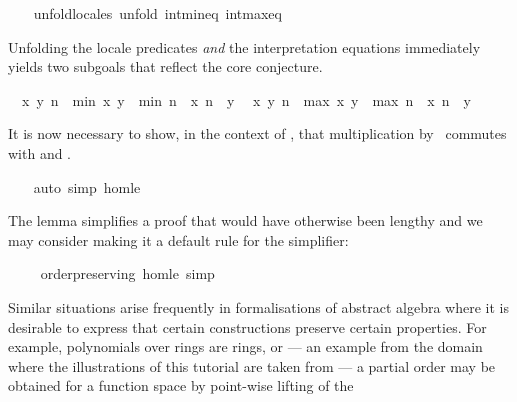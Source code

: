 \begin{isabellebody}
\ \ \isamarkupfalse%
\ {\isacharparenleft}unfold{\isacharunderscore}locales{\isacharcomma}\ unfold\ int{\isacharunderscore}min{\isacharunderscore}eq\ int{\isacharunderscore}max{\isacharunderscore}eq{\isacharparenright}%
\begin{isamarkuptxt}%
\normalsize Unfolding the locale predicates \emph{and} the
      interpretation equations immediately yields two subgoals that
      reflect the core conjecture.
      \begin{isabelle}%
\ {}{\isachardot}\ {\isasymAnd}x\ y{\isachardot}\ n\ {\isacharasterisk}\ min\ x\ y\ {\isacharequal}\ min\ {\isacharparenleft}n\ {\isacharasterisk}\ x{\isacharparenright}\ {\isacharparenleft}n\ {\isacharasterisk}\ y{\isacharparenright}\isanewline
\ {}{\isachardot}\ {\isasymAnd}x\ y{\isachardot}\ n\ {\isacharasterisk}\ max\ x\ y\ {\isacharequal}\ max\ {\isacharparenleft}n\ {\isacharasterisk}\ x{\isacharparenright}\ {\isacharparenleft}n\ {\isacharasterisk}\ y{\isacharparenright}%
\end{isabelle}
      It is now necessary to show, in the context of , that multiplication by~ commutes with
       and .%
\end{isamarkuptxt}%
\isamarkuptrue%
\ \ \isamarkupfalse%
\ {\isacharparenleft}auto\ simp{\isacharcolon}\ hom{\isacharunderscore}le{\isacharparenright}%
\endisatagvisible
{\isafoldvisible}%
%
\isadelimvisible
%
\endisadelimvisible
%
\begin{isamarkuptext}%
The lemma 
  simplifies a proof that would have otherwise been lengthy and we may
  consider making it a default rule for the simplifier:%
\end{isamarkuptext}%
\isamarkuptrue%
\ \ \isamarkupfalse%
\ {\isacharparenleft}\ order{\isacharunderscore}preserving{\isacharparenright}\ hom{\isacharunderscore}le\ {\isacharbrackleft}simp{\isacharbrackright}%
\isamarkuptrue%
%
\begin{isamarkuptext}%
Similar situations arise frequently in formalisations of
  abstract algebra where it is desirable to express that certain
  constructions preserve certain properties.  For example, polynomials
  over rings are rings, or --- an example from the domain where the
  illustrations of this tutorial are taken from --- a partial order
  may be obtained for a function space by point-wise lifting of the

\end{isamarkuptext}
\end{isabellebody}

